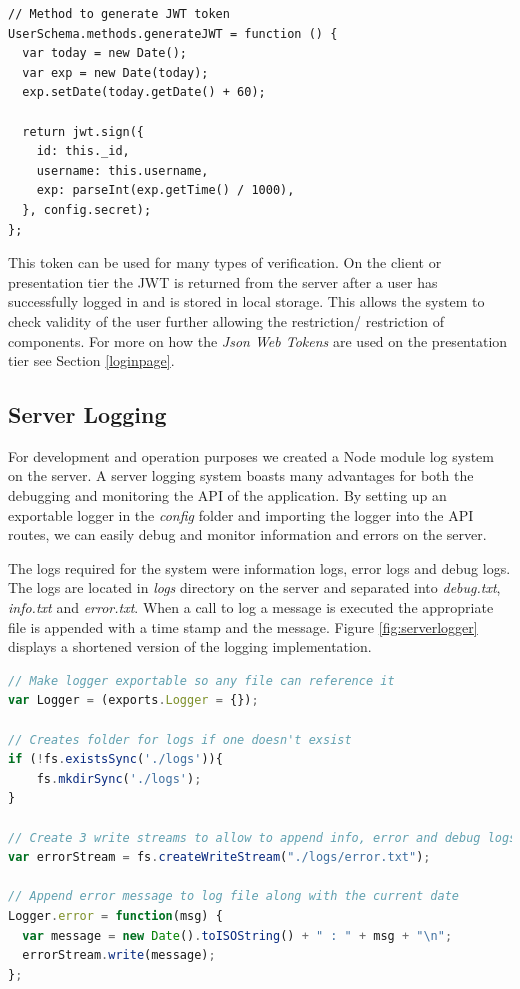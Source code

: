 \begin{lstlisting}[language=JAVASCRIPTcaption={Creating a JSON Web Token},captionpos=b,label={fig:jwttoken}]
// Method to generate JWT token
UserSchema.methods.generateJWT = function () {
  var today = new Date();
  var exp = new Date(today);
  exp.setDate(today.getDate() + 60);

  return jwt.sign({
    id: this._id,
    username: this.username,
    exp: parseInt(exp.getTime() / 1000),
  }, config.secret);
};
\end{lstlisting}

This token can be used for many types of verification. On the client or presentation tier the JWT is returned from the server after a user has successfully logged in and is stored in local storage. This allows the system to check validity of the user further allowing the restriction/ restriction of components. For more on how the \textit{Json Web Tokens} are used on the presentation tier see Section \ref{loginpage}.

\subsection{Server Logging}
For development and operation purposes we created a Node module log system on the server. A server logging system boasts many advantages for both the debugging and monitoring the API of the application. By setting up an exportable logger in the \textit{config} folder and importing the logger into the API routes, we can easily debug and monitor information and errors on the server.

The logs required for the system were information logs, error logs and debug logs. The logs are located in \textit{logs} directory on the server and separated into \textit{debug.txt}, \textit{info.txt} and \textit{error.txt}. When a call to log a message is executed  the appropriate file is appended with a time stamp and the message. Figure \ref{fig:serverlogger} displays a shortened version of the logging implementation.

\begin{lstlisting}[language=JAVASCRIPT,caption={Server Logging},captionpos=b,label={fig:serverlogger}]
// Make logger exportable so any file can reference it
var Logger = (exports.Logger = {});

// Creates folder for logs if one doesn't exsist
if (!fs.existsSync('./logs')){
    fs.mkdirSync('./logs');
}

// Create 3 write streams to allow to append info, error and debug logs to different streams.
var errorStream = fs.createWriteStream("./logs/error.txt");

// Append error message to log file along with the current date
Logger.error = function(msg) {
  var message = new Date().toISOString() + " : " + msg + "\n";
  errorStream.write(message);
};
\end{lstlisting}

